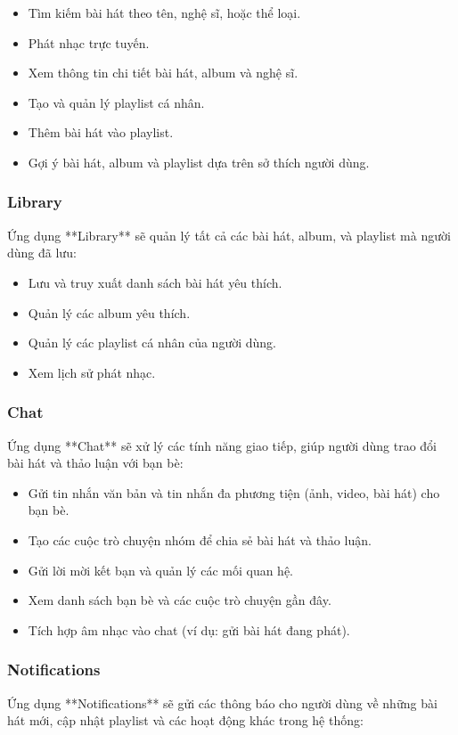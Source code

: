 \documentclass[a4paper]{article}
\begin{document}
\begin{itemize}
    \item Tìm kiếm bài hát theo tên, nghệ sĩ, hoặc thể loại.
    \item Phát nhạc trực tuyến.
    \item Xem thông tin chi tiết bài hát, album và nghệ sĩ.
    \item Tạo và quản lý playlist cá nhân.
    \item Thêm bài hát vào playlist.
    \item Gợi ý bài hát, album và playlist dựa trên sở thích người dùng.
\end{itemize}

\subsubsection{Library}
Ứng dụng **Library** sẽ quản lý tất cả các bài hát, album, và playlist mà người dùng đã lưu:

\begin{itemize}
    \item Lưu và truy xuất danh sách bài hát yêu thích.
    \item Quản lý các album yêu thích.
    \item Quản lý các playlist cá nhân của người dùng.
    \item Xem lịch sử phát nhạc.
\end{itemize}

\subsubsection{Chat}
Ứng dụng **Chat** sẽ xử lý các tính năng giao tiếp, giúp người dùng trao đổi bài hát và thảo luận với bạn bè:

\begin{itemize}
    \item Gửi tin nhắn văn bản và tin nhắn đa phương tiện (ảnh, video, bài hát) cho bạn bè.
    \item Tạo các cuộc trò chuyện nhóm để chia sẻ bài hát và thảo luận.
    \item Gửi lời mời kết bạn và quản lý các mối quan hệ.
    \item Xem danh sách bạn bè và các cuộc trò chuyện gần đây.
    \item Tích hợp âm nhạc vào chat (ví dụ: gửi bài hát đang phát).
\end{itemize}

\subsubsection{Notifications}
Ứng dụng **Notifications** sẽ gửi các thông báo cho người dùng về những bài hát mới, cập nhật playlist và các hoạt động khác trong hệ thống:
\end{document}
